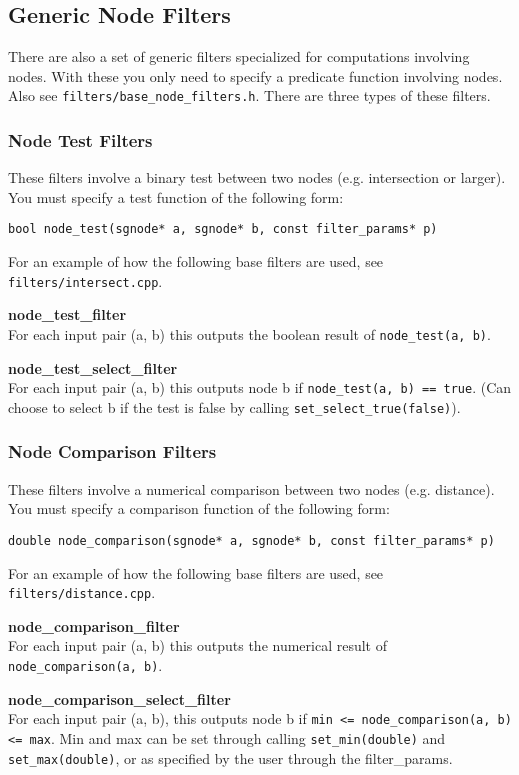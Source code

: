 \subsection{Generic Node Filters}
There are also a set of generic filters specialized for computations involving nodes. 
With these you only need to specify a predicate function involving nodes. 
Also see \texttt{filters/base\_node\_filters.h}.
There are three types of these filters. 

\subsubsection{Node Test Filters}
These filters involve a binary test between two nodes (e.g. intersection or larger). 
You must specify a test function of the following form:
\begin{verbatim}
bool node_test(sgnode* a, sgnode* b, const filter_params* p)
\end{verbatim}
For an example of how the following base filters are used, see \texttt{filters/intersect.cpp}.

\textbf{node\_test\_filter} \\
For each input pair (a, b) this outputs the boolean result of \texttt{node\_test(a, b)}.

\textbf{node\_test\_select\_filter} \\
For each input pair (a, b) this outputs node b if \texttt{node\_test(a, b) == true}. 
(Can choose to select b if the test is false by calling \texttt{set\_select\_true(false)}).

\subsubsection{Node Comparison Filters}
These filters involve a numerical comparison between two nodes (e.g. distance). 
You must specify a comparison function of the following form:
\begin{verbatim}
double node_comparison(sgnode* a, sgnode* b, const filter_params* p)
\end{verbatim}

For an example of how the following base filters are used, see \texttt{filters/distance.cpp}.

\textbf{node\_comparison\_filter} \\
For each input pair (a, b) this outputs the numerical result of \texttt{node\_comparison(a, b)}. 

\textbf{node\_comparison\_select\_filter} \\
For each input pair (a, b), this outputs node b if 
\texttt{min <= node\_comparison(a, b) <= max}. 
Min and max can be set through calling \texttt{set\_min(double)} 
and \texttt{set\_max(double)}, or as specified by the user through the filter\_params. 

